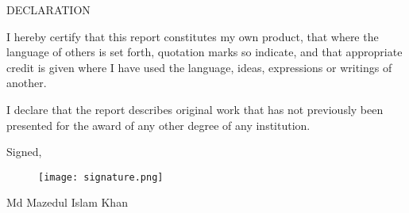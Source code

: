 \begin{center}
    DECLARATION
    \vspace{5mm}
\end{center}

I hereby certify that this report constitutes my own product, that where the language of others is set forth, quotation marks so indicate, and that appropriate credit is given where I have used the language, ideas, expressions or writings of another.

\vspace{1em}

I declare that the report describes original work that has not previously been presented for the award of any other degree of any institution.

\vspace{2em}

\noindent\hspace{8cm}Signed,
\begin{figure}[H]
    \hspace{8cm}
    \texttt{[image: signature.png]}
\end{figure}

\noindent\hspace{8cm}Md Mazedul Islam Khan
